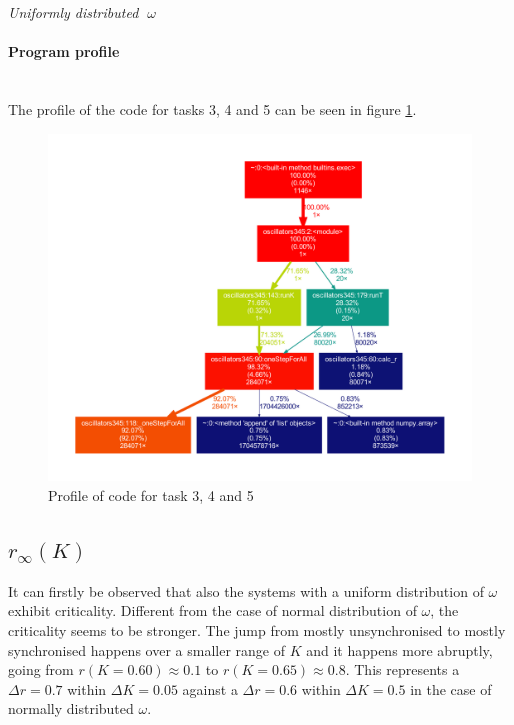 \documentclass[11pt,a4paper]{article}
\newcommand{\para}[1]{\paragraph{#1}\mbox{}\\}
\begin{document}
\clearpage
\bigskip\noindent
{\Large\textit{Uniformly distributed $\;\omega$}}



\para{Program profile}
The profile of the code for tasks 3, 4 and 5 can be seen in figure \ref{profile345}.
\begin{figure}[h]
	\centering
	\includegraphics[width=\textwidth]{graphics/profile345.pdf} %
	\vspace{-15mm}
	\caption{Profile of code for task 3, 4 and 5}
	\label{profile345}
\end{figure}

\subsection{$r_{\infty}(K)$}

It can firstly be observed that also the systems with a uniform distribution of $\omega$ exhibit criticality. 
Different from the case of normal distribution of $\omega$, the criticality seems to be stronger. 
The jump from mostly unsynchronised to mostly synchronised happens over a smaller range of $K$ and it happens more abruptly, going from $r(K=0.60) \approx 0.1$ to $r(K=0.65) \approx 0.8$.
This represents a $\Delta r = 0.7$ within $\Delta K = 0.05$ against a $\Delta r = 0.6$ within $\Delta K = 0.5$ in the case of normally distributed $\omega$.
\end{document}
